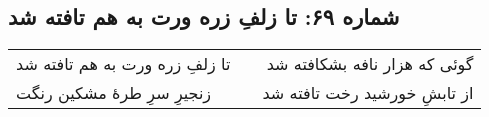 \begin{center}
\section*{شماره ۶۹: تا زلفِ زره ورت به هم تافته شد}
\label{sec:069}
\begin{longtable}{l p{0.5cm} r}
تا زلفِ زره ورت به هم تافته شد
&&
گوئی که هزار نافه بشکافته شد
\\
زنجیرِ سرِ طرهٔ مشکین رنگت
&&
از تابشِ خورشید رخت تافته شد
\\
\end{longtable}
\end{center}
